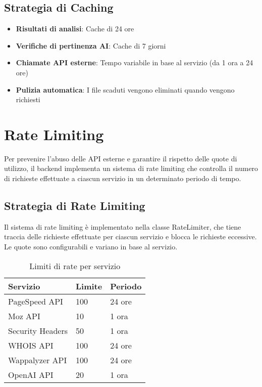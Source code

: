 \subsection{Strategia di Caching}
\begin{itemize}
    \item \textbf{Risultati di analisi}: Cache di 24 ore
    \item \textbf{Verifiche di pertinenza AI}: Cache di 7 giorni
    \item \textbf{Chiamate API esterne}: Tempo variabile in base al servizio (da 1 ora a 24 ore)
    \item \textbf{Pulizia automatica}: I file scaduti vengono eliminati quando vengono richiesti
\end{itemize}

\section{Rate Limiting}
Per prevenire l'abuso delle API esterne e garantire il rispetto delle quote di utilizzo, il backend implementa un sistema di rate limiting che controlla il numero di richieste effettuate a ciascun servizio in un determinato periodo di tempo.

\subsection{Strategia di Rate Limiting}
Il sistema di rate limiting è implementato nella classe RateLimiter, che tiene traccia delle richieste effettuate per ciascun servizio e blocca le richieste eccessive. Le quote sono configurabili e variano in base al servizio.

\begin{table}[H]
\centering
\begin{tabular}{|l|l|l|}
\hline
\textbf{Servizio} & \textbf{Limite} & \textbf{Periodo} \\
\hline
PageSpeed API & 100 & 24 ore \\
\hline
Moz API & 10 & 1 ora \\
\hline
Security Headers & 50 & 1 ora \\
\hline
WHOIS API & 100 & 24 ore \\
\hline
Wappalyzer API & 100 & 24 ore \\
\hline
OpenAI API & 20 & 1 ora \\
\hline
\end{tabular}
\caption{Limiti di rate per servizio}
\label{table:rate-limits}
\end{table}

